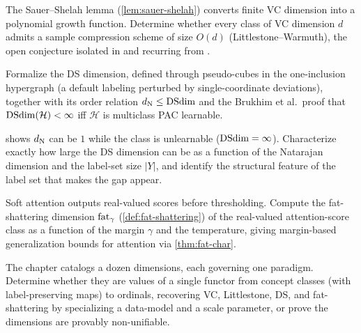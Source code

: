 \begin{openprob}
\label{op:od-compression-dim}
The Sauer--Shelah lemma (\cref{lem:sauer-shelah}) converts finite VC dimension into a polynomial growth function.  Determine whether every class of VC dimension $d$ admits a sample compression scheme of size $O(d)$ (Littlestone--Warmuth), the open conjecture isolated in  and recurring from .
\end{openprob}

\begin{openprob}
\label{op:ds-formal}
Formalize the DS dimension, defined through pseudo-cubes in the one-inclusion hypergraph (a default labeling perturbed by single-coordinate deviations), together with its order relation $d_{\mathrm{N}} \le \mathrm{DSdim}$ and the Brukhim et al.\ proof that $\mathrm{DSdim}(\mathcal{H}) < \infty$ iff $\mathcal{H}$ is multiclass PAC learnable.
\end{openprob}

\begin{openprob}
\label{op:natarajan-ds-gap}
 shows $d_{\mathrm{N}}$ can be $1$ while the class is unlearnable ($\mathrm{DSdim} = \infty$).  Characterize exactly how large the DS dimension can be as a function of the Natarajan dimension and the label-set size $|Y|$, and identify the structural feature of the label set that makes the gap appear.
\end{openprob}

\begin{openprob}
\label{op:fat-attention}
Soft attention outputs real-valued scores before thresholding.  Compute the fat-shattering dimension $\mathrm{fat}_\gamma$ (\cref{def:fat-shattering}) of the real-valued attention-score class as a function of the margin $\gamma$ and the temperature, giving margin-based generalization bounds for attention via \cref{thm:fat-char}.
\end{openprob}

\begin{openprob}
\label{op:dimension-functor}
The chapter catalogs a dozen dimensions, each governing one paradigm.  Determine whether they are values of a single functor from concept classes (with label-preserving maps) to ordinals, recovering VC, Littlestone, DS, and fat-shattering by specializing a data-model and a scale parameter, or prove the dimensions are provably non-unifiable.
\end{openprob}

